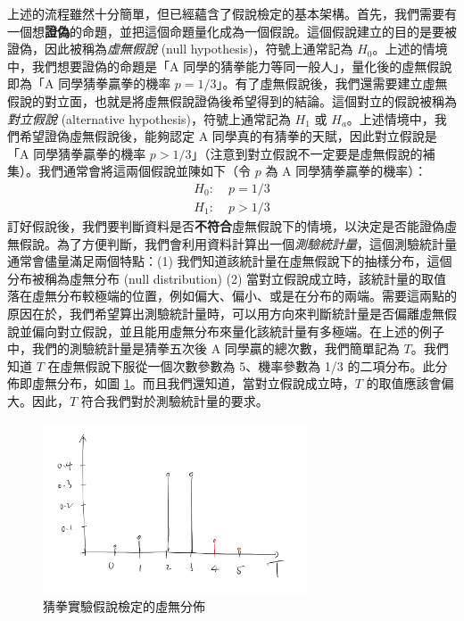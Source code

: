     上述的流程雖然十分簡單，但已經蘊含了假說檢定的基本架構。首先，我們需要有一個想\textbf{證偽}的命題，並把這個命題量化成為一個假說。這個假說建立的目的是要被證偽，因此被稱為\textit{虛無假說} (null hypothesis)，符號上通常記為 $H_0$。上述的情境中，我們想要證偽的命題是「A 同學的猜拳能力等同一般人」，量化後的虛無假說即為「A 同學猜拳贏拳的機率 $p = 1/3$」。有了虛無假說後，我們還需要建立虛無假說的對立面，也就是將虛無假說證偽後希望得到的結論。這個對立的假說被稱為\textit{對立假說} (alternative hypothesis)，符號上通常記為 $H_1$ 或 $H_a$。上述情境中，我們希望證偽虛無假說後，能夠認定 A 同學真的有猜拳的天賦，因此對立假說是「A 同學猜拳贏拳的機率 $p > 1/3$」（注意到對立假說不一定要是虛無假說的補集）。我們通常會將這兩個假說並陳如下（令 $p$ 為 A 同學猜拳贏拳的機率）：
    \begin{align*}
        H_0: \;&p = 1/3\\
        H_1: \;&p > 1/3
    \end{align*}
    訂好假說後，我們要判斷資料是否\textbf{不符合}虛無假說下的情境，以決定是否能證偽虛無假說。為了方便判斷，我們會利用資料計算出一個\textit{測驗統計量}，這個測驗統計量通常會儘量滿足兩個特點：(1) 我們知道該統計量在虛無假說下的抽樣分布，這個分布被稱為虛無分布 (null distribution) (2) 當對立假說成立時，該統計量的取值落在虛無分布較極端的位置，例如偏大、偏小、或是在分布的兩端。需要這兩點的原因在於，我們希望算出測驗統計量時，可以用方向來判斷統計量是否偏離虛無假說並偏向對立假說，並且能用虛無分布來量化該統計量有多極端。在上述的例子中，我們的測驗統計量是猜拳五次後 A 同學贏的總次數，我們簡單記為 $T$。我們知道 $T$ 在虛無假說下服從一個次數參數為 5、機率參數為 1/3 的二項分布。此分佈即虛無分布，如圖 \ref{fig:null_dist_binom}。而且我們還知道，當對立假說成立時，$T$ 的取值應該會偏大。因此，$T$ 符合我們對於測驗統計量的要求。

    \begin{figure}[htbp]
        \centering
        \includegraphics[width=0.7\textwidth]{figures/06-Hypothesis_testing/null_dist_binom.jpeg}
        \caption{猜拳實驗假說檢定的虛無分佈}
        \label{fig:null_dist_binom}
    \end{figure}
 
